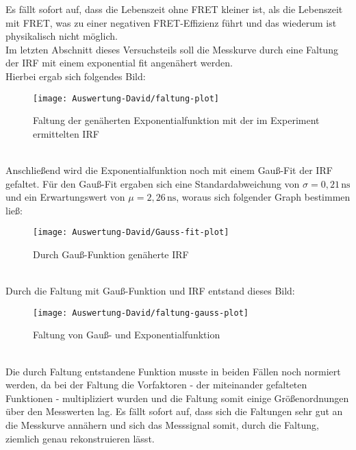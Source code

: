 Es fällt sofort auf, dass die Lebenszeit ohne FRET kleiner ist, als die Lebenszeit mit FRET, was zu einer negativen FRET-Effizienz führt und das wiederum ist physikalisch nicht möglich. \\
Im letzten Abschnitt dieses Versuchsteils soll die Messkurve durch eine Faltung der IRF mit einem exponential fit angenähert werden.\\
\newpage
Hierbei ergab sich folgendes Bild:\\
\begin{figure}[h]
	\centering
	\texttt{[image: Auswertung-David/faltung-plot]}
	\caption{Faltung der genäherten Exponentialfunktion mit der im Experiment ermittelten IRF}
	\label{Faltung von IRF und Exponentialfkt.}
\end{figure}\\
Anschließend wird die Exponentialfunktion noch mit einem Gauß-Fit der IRF gefaltet.  Für den Gauß-Fit ergaben sich eine Standardabweichung von $\sigma=0,21\,\mathrm{ns}$ und ein Erwartungswert von $\mu=2,26\,\mathrm{ns}$, woraus sich folgender Graph bestimmen ließ:
\begin{figure}[h]
	\centering
	\texttt{[image: Auswertung-David/Gauss-fit-plot]}
	\caption{Durch Gauß-Funktion genäherte IRF}
	\label{Gauss-Fit}
\end{figure}\\
\newpage
Durch die Faltung mit Gauß-Funktion und IRF entstand dieses Bild:
\begin{figure}[h]
	\centering
	\texttt{[image: Auswertung-David/faltung-gauss-plot]}
	\caption{Faltung von Gauß- und Exponentialfunktion}
	\label{Faltung mit Gauss-Fit}
\end{figure}\\
Die durch Faltung entstandene Funktion musste in beiden Fällen noch normiert werden, da bei der Faltung die Vorfaktoren - der miteinander gefalteten Funktionen - multipliziert wurden und die Faltung somit einige Größenordnungen über den Messwerten lag. Es fällt sofort auf, dass sich die Faltungen sehr gut an die Messkurve annähern und sich das Messsignal somit, durch die Faltung, ziemlich genau rekonstruieren lässt.
\newpage
